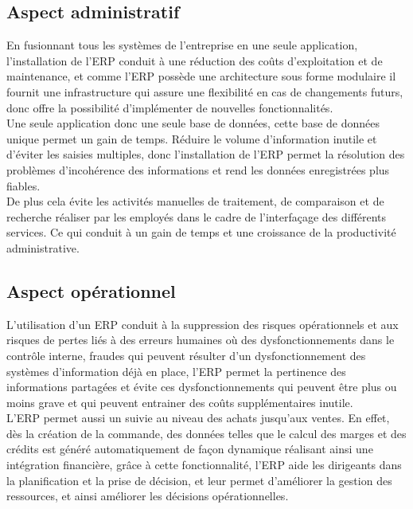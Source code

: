     \subsection{Aspect administratif}
        En fusionnant tous les systèmes de l’entreprise en une seule application, l’installation de l’ERP conduit à une réduction des coûts d’exploitation et de maintenance, et comme l’ERP possède une architecture sous forme modulaire il fournit une infrastructure qui assure une flexibilité en cas de changements futurs, donc offre la possibilité d’implémenter de nouvelles fonctionnalités.\\

        Une seule application donc une seule base de données, cette base de données unique permet un gain de temps. Réduire le volume d’information inutile et d’éviter les saisies multiples, donc l’installation de l’ERP permet la résolution des problèmes d’incohérence des informations et rend les données enregistrées plus fiables.\\

        De plus cela évite les activités manuelles de traitement, de comparaison et de recherche réaliser par les employés dans le cadre de l’interfaçage des différents services. Ce qui conduit à un gain de temps et une croissance de la productivité administrative.

    \subsection{Aspect opérationnel}
        L’utilisation d’un ERP conduit à la suppression des risques opérationnels et aux risques de pertes liés à des erreurs humaines où des dysfonctionnements dans le contrôle interne, fraudes qui peuvent résulter d’un dysfonctionnement des systèmes d’information déjà en place, l’ERP permet la pertinence des informations partagées et évite ces dysfonctionnements qui peuvent être plus ou moins grave et qui peuvent entrainer des coûts supplémentaires inutile.\\

        L’ERP permet aussi un suivie au niveau des achats jusqu’aux ventes. En effet, dès la création de la commande, des données telles que le calcul des marges et des crédits est généré automatiquement de façon dynamique réalisant ainsi une intégration financière, grâce à cette fonctionnalité, l’ERP aide les dirigeants dans la planification et la prise de décision, et leur permet d’améliorer la gestion des ressources, et ainsi améliorer les décisions opérationnelles.\\

